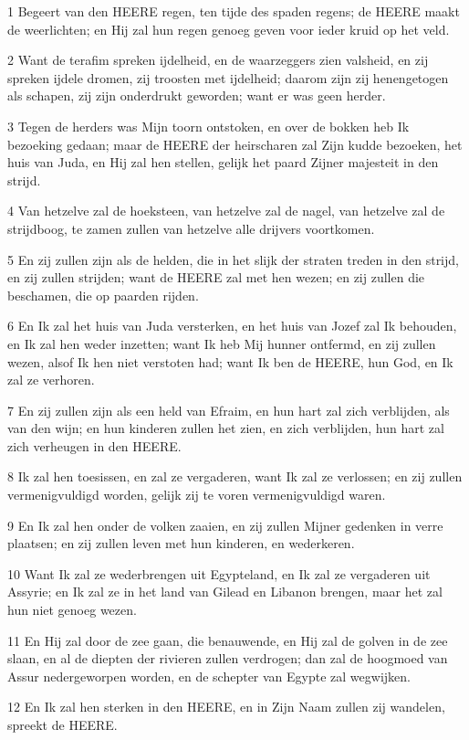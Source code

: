 \par 1 Begeert van den HEERE regen, ten tijde des spaden regens; de HEERE maakt de weerlichten; en Hij zal hun regen genoeg geven voor ieder kruid op het veld.
\par 2 Want de terafim spreken ijdelheid, en de waarzeggers zien valsheid, en zij spreken ijdele dromen, zij troosten met ijdelheid; daarom zijn zij henengetogen als schapen, zij zijn onderdrukt geworden; want er was geen herder.
\par 3 Tegen de herders was Mijn toorn ontstoken, en over de bokken heb Ik bezoeking gedaan; maar de HEERE der heirscharen zal Zijn kudde bezoeken, het huis van Juda, en Hij zal hen stellen, gelijk het paard Zijner majesteit in den strijd.
\par 4 Van hetzelve zal de hoeksteen, van hetzelve zal de nagel, van hetzelve zal de strijdboog, te zamen zullen van hetzelve alle drijvers voortkomen.
\par 5 En zij zullen zijn als de helden, die in het slijk der straten treden in den strijd, en zij zullen strijden; want de HEERE zal met hen wezen; en zij zullen die beschamen, die op paarden rijden.
\par 6 En Ik zal het huis van Juda versterken, en het huis van Jozef zal Ik behouden, en Ik zal hen weder inzetten; want Ik heb Mij hunner ontfermd, en zij zullen wezen, alsof Ik hen niet verstoten had; want Ik ben de HEERE, hun God, en Ik zal ze verhoren.
\par 7 En zij zullen zijn als een held van Efraim, en hun hart zal zich verblijden, als van den wijn; en hun kinderen zullen het zien, en zich verblijden, hun hart zal zich verheugen in den HEERE.
\par 8 Ik zal hen toesissen, en zal ze vergaderen, want Ik zal ze verlossen; en zij zullen vermenigvuldigd worden, gelijk zij te voren vermenigvuldigd waren.
\par 9 En Ik zal hen onder de volken zaaien, en zij zullen Mijner gedenken in verre plaatsen; en zij zullen leven met hun kinderen, en wederkeren.
\par 10 Want Ik zal ze wederbrengen uit Egypteland, en Ik zal ze vergaderen uit Assyrie; en Ik zal ze in het land van Gilead en Libanon brengen, maar het zal hun niet genoeg wezen.
\par 11 En Hij zal door de zee gaan, die benauwende, en Hij zal de golven in de zee slaan, en al de diepten der rivieren zullen verdrogen; dan zal de hoogmoed van Assur nedergeworpen worden, en de schepter van Egypte zal wegwijken.
\par 12 En Ik zal hen sterken in den HEERE, en in Zijn Naam zullen zij wandelen, spreekt de HEERE.

